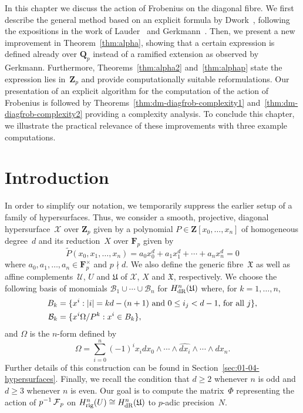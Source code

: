 
In this chapter we discuss the action of Frobenius on the diagonal fibre. 
We first describe the general method based on an explicit formula by 
Dwork~\citep[\S 4]{Dwork64}, following the expositions in the work of 
Lauder~\citep[\S 6]{Lau04} and Gerkmann~\citep[\S 4.4]{Gerkmann2007}.  
Then, we present a new improvement in Theorem~\ref{thm:alpha}, showing 
that a certain expression is defined already over $\mathbf{Q}_p$ instead 
of a ramified extension as observed by Gerkmann.  Furthermore, 
Theorems~\ref{thm:alpha2} and~\ref{thm:alphap} state the expression lies 
in~$\mathbf{Z}_p$ and provide computationally suitable reformulations.  
Our presentation of an explicit algorithm for the computation of the 
action of Frobenius is followed by Theorems~\ref{thm:dm-diagfrob-complexity1} 
and~\ref{thm:dm-diagfrob-complexity2} providing a complexity analysis.
To conclude this chapter, we illustrate the practical relevance of these 
improvements with three example computations.


\section{Introduction}

In order to simplify our notation, we temporarily suppress the earlier 
setup of a family of hypersurfaces.
Thus, we consider a smooth, projective, diagonal hypersurface~$\mathcal{X}$ 
over $\mathbf{Z}_p$ given by a polynomial $P \in \mathbf{Z}[x_0, \dotsc, x_n]$ 
of homogeneous degree~$d$ and its reduction~$X$ over $\mathbf{F}_p$ given by 
\begin{equation*}
\tilde{P}(x_0, x_1, \dotsc, x_n) = 
    a_0 x_0^d + a_1 x_1^d + \dotsb + a_n x_n^d = 0
\end{equation*}
where $a_0, a_1, \dotsc, a_n \in \mathbf{F}_p^{\times}$ and $p \nmid d$.  
We also define the generic fibre~$\mathfrak{X}$  as well as affine 
complements~$\mathcal{U}$, $U$ and $\mathfrak{U}$ of $\mathcal{X}$, $X$ 
and $\mathfrak{X}$, respectively.  We choose the following basis of 
monomials $\mathcal{B}_1 \cup \dotsb \cup \mathcal{B}_n$ for 
$H_{\text{dR}}^n(\mathfrak{U})$ where, for $k = 1, \dotsc, n$, 
\begin{align*}
B_k & = \{ x^i : \text{$\lvert i\rvert = kd - (n+1)$ and $0 \leq i_j < d-1$, for all $j$} \}, \\
\mathcal{B}_k & = \{x^i \Omega / P^k : x^i \in B_k \}, 
\end{align*}
and $\Omega$ is the $n$-form defined by 
\begin{equation*}
\Omega = \sum_{i=0}^n (-1)^i x_i d x_0 \wedge \dotsb \wedge \widehat{d x_i} \wedge \dotsb \wedge d x_n.
\end{equation*}
Further details of this construction can be found in 
Section~\ref{sec:01-04-hypersurfaces}.
Finally, we recall the condition that $d \geq 2$ whenever 
$n$ is odd and $d \geq 3$ whenever $n$ is even.  
Our goal is to compute the matrix~$\Phi$ representing 
the action of $p^{-1} \operatorname{\mathcal{F}}_p$ on $H_{\text{rig}}^n(U) \cong H_{\text{dR}}^n(\mathfrak{U})$ 
to $p$-adic precision~$N$.

